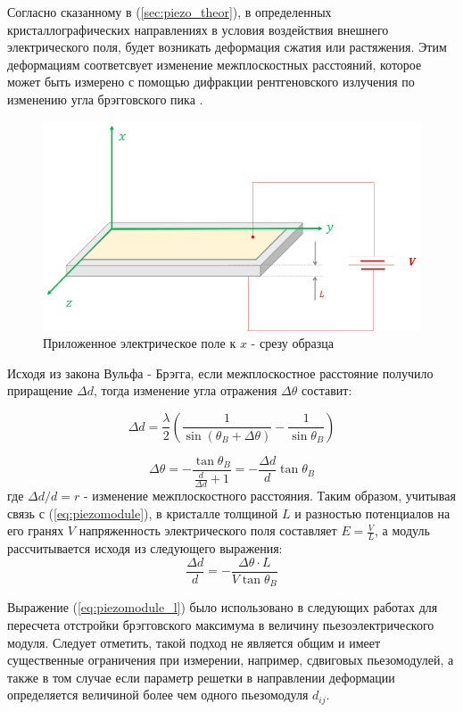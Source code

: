 Согласно сказанному в (\ref{sec:piezo_theor}), в определенных кристаллографических направлениях в
условия воздействия внешнего электрического поля, будет возникать деформация
сжатия или растяжения. Этим деформациям соответсвует изменение межплоскостных
 расстояний, которое может быть измерено с помощью дифракции рентгеновского
 излучения по изменению угла брэгговского пика \cite{marchenkov2014}.

 \begin{figure}[H]
   \centering
   \includegraphics[width=.4\textwidth]{images/piezo.png}
   \caption{Приложенное электрическое поле к $x$ - срезу образца}
   \label{ris:x_cut}
 \end{figure}

Исходя из закона Вульфа - Брэгга, если межплоскостное расстояние получило приращение
$\Delta d$, тогда изменение угла отражения $\Delta \theta$ составит:

$$ \Delta d = \frac{\lambda}{2}\left( \frac{1}{\sin(\theta_B + \Delta \theta) } - \frac{1}{\sin \theta_B } \right) $$

\begin{equation}
   \Delta \theta =-  \frac{\tan \theta_B}{\frac{d}{\Delta d}+1}  = -  \frac{\Delta d }{d}  \tan \theta_B
\end{equation}
\noindent
где $\Delta d/d = r$ - изменение межплоскостного расстояния. Таким образом, учитывая связь с
(\ref{eq:piezomodule}),  в кристалле толщиной $L$ и разностью потенциалов на его
гранях $V$ напряженность электрического поля составляет $E = \frac{V}{L}$, а модуль
 рассчитывается исходя из следующего выражения:
 \begin{equation}
    \frac{\Delta d}{d}  = -\frac{\Delta \theta \cdot L}{V \tan \theta_B}
    \label{eq:piezomodule_l}
 \end{equation}

Выражение (\ref{eq:piezomodule_l}) было использовано в следующих работах
\cite{kibalin2015, marchenkov2014,piezo101,piezo102} для
пересчета отстройки брэгговского максимума в величину пьезоэлектрического модуля.
Следует отметить, такой подход не является общим и имеет существенные ограничения при
измерении, например, сдвиговых пьезомодулей, а также в том случае если параметр решетки
в направлении деформации определяется величиной более чем одного пьезомодуля $d_{ij}$.

